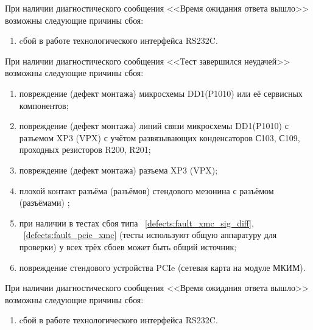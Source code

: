     \subpoint При наличии диагностического сообщения <<Время ожидания ответа вышло>> возможны следующие причины сбоя:
      \begin{enumerate}
	\item cбой в работе технологического интерфейса RS232C.
      \end{enumerate}
      
  \begin{sloppypar}
  \label{defects:fault_pcie_vpx}
    \subpoint При наличии диагностического сообщения <<Тест завершился неудачей>> возможны следующие причины сбоя:
      \begin{enumerate}
	\item повреждение (дефект монтажа) микросхемы DD1(P1010) или её сервисных компонентов;
	\item повреждение (дефект монтажа) линий связи микросхемы DD1(P1010) с разъемом XP3 (VPX) с учётом развязывающих конденсаторов С103, С109, проходных резисторов R200, R201;
	\item повреждение (дефект монтажа) разъема XP3 (VPX);
	\item плохой контакт разъёма (разъёмов) стендового мезонина с разъёмом (разъёмами) \DocProductShortTitle;
	\item при наличии в тестах сбоя типа ~\ref{defects:fault_xmc_sig_diff}, ~\ref{defects:fault_pcie_xmc} (тесты используют общую аппаратуру для проверки) у всех трёх сбоев может быть общий источник;
	\item повреждение стендового устройства PCIe (сетевая карта на модуле МКИМ).
      \end{enumerate}
      
    \subpoint При наличии диагностического сообщения <<Время ожидания ответа вышло>> возможны следующие причины сбоя:
      \begin{enumerate}
	\item cбой в работе технологического интерфейса RS232C.
      \end{enumerate}
   \end{sloppypar}
   
